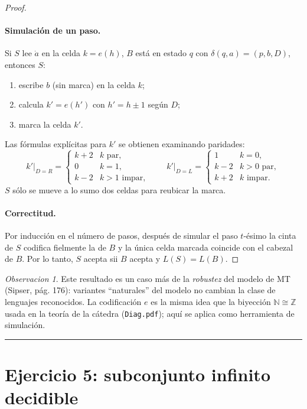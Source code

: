 \documentclass[11pt,a4paper]{article}
\theoremstyle{plain}
\theoremstyle{definition}
\theoremstyle{remark}
\newtheorem*{observacion}{Observacion}
\begin{document}
\begin{proof}
\paragraph{Simulaci\'on de un paso.}
Si $S$ lee $\dot a$ en la celda $k=e(h)$, $B$ est\'a en estado $q$ con
$\delta(q,a)=(p,b,D)$, entonces $S$:
\begin{enumerate}
  \item escribe $b$ (sin marca) en la celda $k$;
  \item calcula $k'=e(h')$ con $h'=h\pm 1$ seg\'un $D$;
  \item marca la celda $k'$.
\end{enumerate}
Las f\'ormulas expl\'icitas para $k'$ se obtienen examinando paridades:
\[
  k'\big|_{D=R} = \begin{cases} k+2 & k\text{ par},\\ 0 & k=1,\\ k-2 & k>1\text{ impar},\end{cases}
  \qquad
  k'\big|_{D=L} = \begin{cases} 1 & k=0,\\ k-2 & k>0\text{ par},\\ k+2 & k\text{ impar}.\end{cases}
\]
$S$ s\'olo se mueve a lo sumo dos celdas para reubicar la marca.

\paragraph{Correctitud.}
Por inducci\'on en el n\'umero de pasos, despu\'es de simular el paso
$t$-\'esimo la cinta de $S$ codifica fielmente la de $B$ y la \'unica celda
marcada coincide con el cabezal de $B$. Por lo tanto, $S$ acepta sii $B$
acepta y $L(S)=L(B)$.
\end{proof}

\begin{observacion}
Este resultado es un caso m\'as de la \emph{robustez} del modelo de MT
(Sipser, p\'ag. 176): variantes ``naturales'' del modelo no cambian la clase
de lenguajes reconocidos. La codificaci\'on $e$ es la misma idea que la
biyecci\'on $\mathbb N\cong\mathbb Z$ usada en la teor\'ia de la c\'atedra
(\texttt{Diag.pdf}); aqu\'i se aplica como herramienta de simulaci\'on.
\end{observacion}

\bigskip\hrule\bigskip

\section{Ejercicio 5: subconjunto infinito decidible}
\label{sec:ej5}
\end{document}
